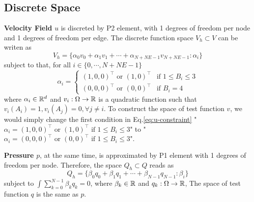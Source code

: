 \subsection{Discrete Space}
\textbf{Velocity Field $u$} is discreted by P2 element, 
with 1 degrees of freedom per node and 1 degrees of freedom per edge.
The discrete function space $V_h\subset V$ can be writen as
\begin{equation}\label{eq:u-space}
  V_h=\{\alpha_0v_0+\alpha_1v_1+\cdots+\alpha_{N+NE-1}v_{N+NE-1}:\alpha_i\}
\end{equation}
subject to that, for all $i\in\{0,\cdots,N+NE-1\}$
\begin{equation}\label{eq:u-constraint}
  \alpha_i=\left\{
  \begin{array}{ll}
    (1,0,0)^\top \text{ or } (1,0)^\top & \text{if } 1\leq B_i\leq 3 \\
    (0,0,0)^\top \text{ or } (0,0)^\top & \text{if } B_i=4
  \end{array}
  \right.
\end{equation}
where $\alpha_i\in\mathbb{R}^d$ and $v_i:\Omega\to\mathbb{R}$ is a 
quadratic function such that $v_i(A_i)=1,v_i(A_j)=0,\forall j\neq i$.
To construct the space of test function $v$, we would simply change the first condition in 
Eq.\eqref{eq:u-constraint} "$\alpha_i=(1,0,0)^\top \text{ or } (1,0)^\top \text{ if } 1\leq B_i\leq 3$" to 
"$\alpha_i=(0,0,0)^\top \text{ or } (0,0)^\top \text{ if } 1\leq B_i\leq3$".

\textbf{Pressure $p$}, at the same time, is approximated by P1 element 
with 1 degrees of freedom per node. Therefore, the space $Q_h\subset Q$ reads as
\begin{equation}\label{eq:p-space}
  Q_h=\{\beta_0q_0+\beta_1q_1+\cdots+\beta_{N-1}q_{N-1}:\beta_i\}
\end{equation}
subject to $\int\sum_{k=0}^{N-1}\beta_kq_k=0$, where $\beta_k\in\mathbb{R}$ and $q_k:\Omega\to\mathbb{R}$,
The space of test function $q$ is the same as $p$.

